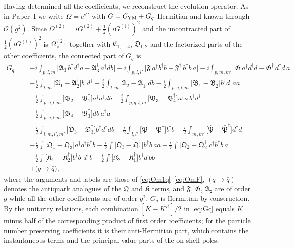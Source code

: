 \documentclass[11pt,a4paper]{article}
\numberwithin{equation}{section}
\newcommand{\mf}[1]{\mathfrak{#1}}
\newcommand{\dg}{\dagger}
\newcommand{\OM}{\Omega}
\newcommand{\order}[1]{\mathcal{O}(#1)}
\begin{document}
Having determined all the coefficients, we reconstruct the evolution operator. As in Paper~I we
write $\OM=e^{iG}$ with $G=G_{\rm YM}+G_{q}$ Hermitian and known through $\order{g^{2}}$. Since
$\OM^{(2)}=iG^{(2)}+\tfrac12(iG^{(1)})^{2}$ and the uncontracted part of $\tfrac12(iG^{(1)})^{2}$ is
$\OM^{(2)}_{\times}$ together with $\mf C_{1,\dots,4}$, $\mf D_{1,2}$ and the factorized parts of the other
coefficients, the connected part of $G_{q}$ is
\begin{align}
G_{q}=&-i\int_{p,l,m}\Big[\mf A_{3}\,b^{\dg}d^{\dg}a-\mf A_{3}^{\dg}\,a^{\dg}db\Big]
-i\int_{p,l,l'}\Big[\mf F\,a^{\dg}b^{\dg}b-\mf F^{\dg}\,b^{\dg}b\,a\Big]
-i\int_{p,m,m'}\Big[\mf G\,a^{\dg}d^{\dg}d-\mf G^{\dg}\,d^{\dg}d\,a\Big]
\nonumber\\
&-\frac{i}{2}\int_{l,m}\Big[\mf A_{1}-\mf A_{2}^{\dg}\Big]b^{\dg}d^{\dg}
-\frac{i}{2}\int_{l,m}\Big[\mf A_{2}-\mf A_{1}^{\dg}\Big]db
-\frac{i}{2}\int_{p,q,l,m}\Big[\mf B_{1}-\mf B_{2}^{\dg}\Big]b^{\dg}d^{\dg}aa
\nonumber\\
&-\frac{i}{2}\int_{p,q,l,m}\Big[\mf B_{2}-\mf B_{1}^{\dg}\Big]a^{\dg}a^{\dg}db
-\frac{i}{2}\int_{p,q,l,m}\Big[\mf B_{3}-\mf B_{4}^{\dg}\Big]a^{\dg}a\,b^{\dg}d^{\dg}
\nonumber\\
&-\frac{i}{2}\int_{p,q,l,m}\Big[\mf B_{4}-\mf B_{3}^{\dg}\Big]db\,a^{\dg}a
\nonumber\\
&-\frac{i}{2}\int_{l,m,l',m'}\Big[\mf D_{3}-\mf D_{3}^{\dg}\Big]b^{\dg}d^{\dg}db
-\frac{i}{2}\int_{l,l'}\Big[\mf P-\mf P^{\dg}\Big]b^{\dg}b
-\frac{i}{2}\int_{m,m'}\Big[\bar{\mf P}-\bar{\mf P}^{\dg}\Big]d^{\dg}d
\nonumber\\
&-\frac{i}{2}\int\Big[\mf Q_{1}-\mf Q_{3}^{\dg}\Big]a^{\dg}a^{\dg}b^{\dg}b
-\frac{i}{2}\int\Big[\mf Q_{3}-\mf Q_{1}^{\dg}\Big]b^{\dg}b\,aa
-\frac{i}{2}\int\Big[\mf Q_{2}-\mf Q_{2}^{\dg}\Big]a^{\dg}b^{\dg}b\,a
\nonumber\\
&-\frac{i}{2}\int\Big[\mf K_{1}-\mf K_{2}^{\dg}\Big]b^{\dg}b^{\dg}d^{\dg}b
-\frac{i}{2}\int\Big[\mf K_{2}-\mf K_{1}^{\dg}\Big]b^{\dg}d\,bb
\nonumber\\
&+\big(q\to\bar q\big),
\label{eq:Gq}
\end{align}
where the arguments and labels are those of \eqref{eq:Om1q}--\eqref{eq:OmF}, $(q\to\bar q)$ denotes the
antiquark analogues of the $\mf Q$ and $\mf K$ terms, and $\mf F$, $\mf G$, $\mf A_{3}$ are of order $g$ while
all the other coefficients are of order $g^{2}$. $G_{q}$ is Hermitian by construction. By the
unitarity relations, each combination $[K-K'^{\dg}]/2$ in \eqref{eq:Gq} equals $K$ minus half of the
corresponding product of first order coefficients; for the particle number preserving coefficients
it is their anti-Hermitian part, which contains the instantaneous terms and the principal value
parts of the on-shell poles.
\end{document}
